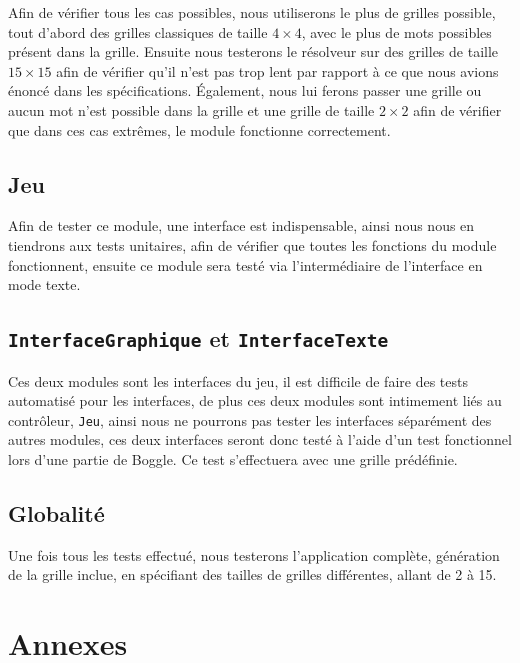 \documentclass[12pt,a4paper,openany]{article}
\begin{document}
		Afin de vérifier tous les cas possibles, nous utiliserons le plus de grilles possible, tout d'abord des grilles classiques de taille $4\times4$, 
		avec le plus de mots possibles présent dans la grille. Ensuite nous testerons le résolveur sur des grilles de taille $15\times 15$ afin de 
		vérifier qu'il n'est pas trop lent par rapport à ce que nous avions énoncé dans les spécifications. Également, nous lui
		ferons passer une grille ou aucun mot n'est possible dans la grille et une grille de taille $2\times 2$ afin de vérifier que dans ces cas extrêmes, le module fonctionne correctement.

	\subsection{Jeu}
	Afin de tester ce module, une interface est indispensable, ainsi nous nous en tiendrons aux tests unitaires, afin de vérifier que toutes les fonctions du
	module fonctionnent, ensuite ce module sera testé via l'intermédiaire de l'interface en mode texte.

	\subsection{\texttt{InterfaceGraphique} et \texttt{InterfaceTexte}}
	Ces deux modules sont les interfaces du jeu, il est difficile de faire des tests automatisé pour les interfaces, de plus ces deux modules sont intimement
	liés au contrôleur, \texttt{Jeu}, ainsi nous ne pourrons pas tester les interfaces séparément des autres modules, ces deux interfaces seront donc testé à
	l'aide d'un test fonctionnel lors d'une partie de Boggle. Ce test s'effectuera avec une grille prédéfinie.

	\subsection{Globalité}
	Une fois tous les tests effectué, nous testerons l'application complète, génération de la grille inclue, en spécifiant des tailles de grilles différentes,
	allant de 2 à 15.

	\newpage
	\appendix
	\section{Annexes}
	\listoffigures
	\listoftables
	
\end{document}
